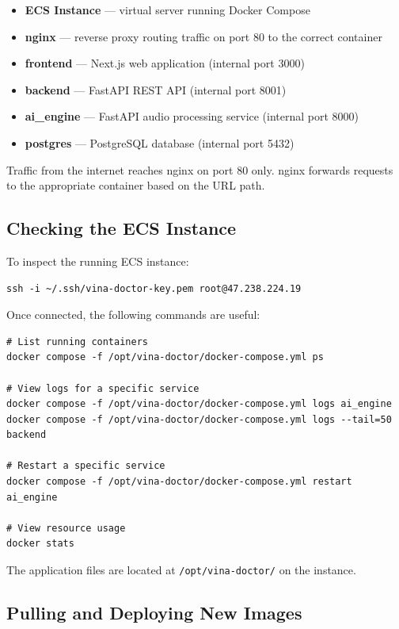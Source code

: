 \documentclass[12pt,a4paper]{article}
\begin{document}
\begin{itemize}
	\item \textbf{ECS Instance} — virtual server running Docker Compose
	\item \textbf{nginx} — reverse proxy routing traffic on port 80 to the correct container
	\item \textbf{frontend} — Next.js web application (internal port 3000)
	\item \textbf{backend} — FastAPI REST API (internal port 8001)
	\item \textbf{ai\_engine} — FastAPI audio processing service (internal port 8000)
	\item \textbf{postgres} — PostgreSQL database (internal port 5432)
\end{itemize}

Traffic from the internet reaches nginx on port 80 only. nginx forwards requests
to the appropriate container based on the URL path.

\subsection{Checking the ECS Instance}

To inspect the running ECS instance:

\begin{verbatim}
ssh -i ~/.ssh/vina-doctor-key.pem root@47.238.224.19
\end{verbatim}

Once connected, the following commands are useful:

\begin{verbatim}
# List running containers
docker compose -f /opt/vina-doctor/docker-compose.yml ps

# View logs for a specific service
docker compose -f /opt/vina-doctor/docker-compose.yml logs ai_engine
docker compose -f /opt/vina-doctor/docker-compose.yml logs --tail=50 backend

# Restart a specific service
docker compose -f /opt/vina-doctor/docker-compose.yml restart ai_engine

# View resource usage
docker stats
\end{verbatim}

The application files are located at \texttt{/opt/vina-doctor/} on the instance.

\subsection{Pulling and Deploying New Images}
\end{document}
